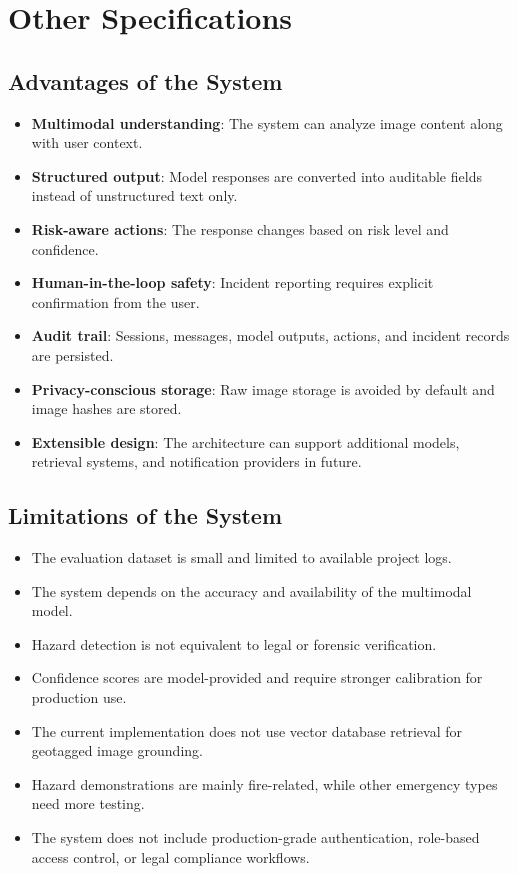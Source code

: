 \chapter{Other Specifications}

\section{Advantages of the System}
\begin{itemize}
\item \textbf{Multimodal understanding}: The system can analyze image content along with user context.
\item \textbf{Structured output}: Model responses are converted into auditable fields instead of unstructured text only.
\item \textbf{Risk-aware actions}: The response changes based on risk level and confidence.
\item \textbf{Human-in-the-loop safety}: Incident reporting requires explicit confirmation from the user.
\item \textbf{Audit trail}: Sessions, messages, model outputs, actions, and incident records are persisted.
\item \textbf{Privacy-conscious storage}: Raw image storage is avoided by default and image hashes are stored.
\item \textbf{Extensible design}: The architecture can support additional models, retrieval systems, and notification providers in future.
\end{itemize}

\section{Limitations of the System}
\begin{itemize}
\item The evaluation dataset is small and limited to available project logs.
\item The system depends on the accuracy and availability of the multimodal model.
\item Hazard detection is not equivalent to legal or forensic verification.
\item Confidence scores are model-provided and require stronger calibration for production use.
\item The current implementation does not use vector database retrieval for geotagged image grounding.
\item Hazard demonstrations are mainly fire-related, while other emergency types need more testing.
\item The system does not include production-grade authentication, role-based access control, or legal compliance workflows.
\end{itemize}

